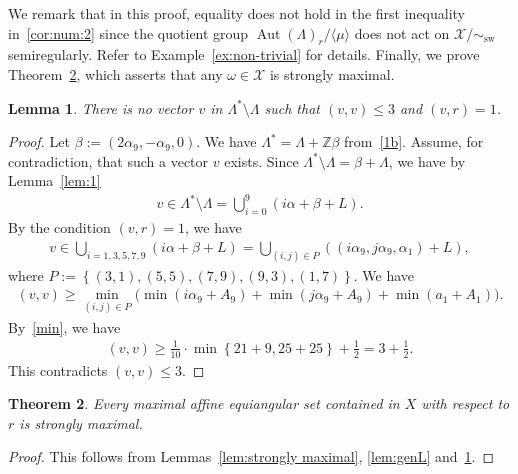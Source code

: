 \documentclass[reqno, 11pt]{amsart}
\numberwithin{equation}{section}
\newtheorem{lem}{Lemma}[section]
\newtheorem{thm}[lem]{Theorem}%
\theoremstyle{definition}
\DeclareMathOperator{\Aut}{Aut}
\DeclareMathOperator{\sw}{sw}
\newcommand{\aes}{\omega}
\newcommand{\cX}{\mathcal{X}}
\newcommand{\Z}{\mathbb{Z}}
\newcommand{\sr}{ r } %
\begin{document}
We remark that in this proof, equality does not hold in the first inequality in~\eqref{cor:num:2} since the quotient group $\Aut(\Lambda)_{\sr}/\langle \mu \rangle$ does not act on $\cX/\sim_{\sw}$ semiregularly.
Refer to Example~\ref{ex:non-trivial} for details. 
Finally, we prove Theorem~\ref{thm:strongly maximal}, which asserts that any $\aes \in \cX$ is strongly maximal.
\begin{lem}	\label{lem:11}
	There is no vector $v$ in $\Lambda^* \setminus \Lambda$ such that $(v,v) \leq 3$ and $(v,\sr) = 1$.
\end{lem}
\begin{proof}
	Let $\beta := (2\alpha_9, -\alpha_9, 0)$.
	We have $\Lambda^* = \Lambda +  \Z \beta$ from~\eqref{1b}.
	Assume, for contradiction, that such a vector $v$ exists.
	Since $\Lambda^* \setminus \Lambda = \beta + \Lambda$, we have by Lemma~\ref{lem:1}
	\begin{align*}
		v \in \Lambda^* \setminus \Lambda
		= \bigcup_{i=0}^{9} ( i \alpha + \beta  + L ).
	\end{align*}
	By the condition $(v,\sr)  = 1$, we have
	\begin{align*}
		v
		\in \bigcup_{i=1,3,5,7,9} ( i \alpha + \beta  + L )
		= \bigcup_{(i,j) \in P} \left((i \alpha_9, j \alpha_9 , \alpha_1) + L \right),
	\end{align*}
	where
	$
		P := \left\{ (3,1),(5,5),(7,9),(9,3),(1,7)  \right\}.
	$
	We have
	\begin{align*}
		(v,v) \geq \min_{(i,j) \in P} \big( \min\left(i \alpha_9 + A_9 \right)+ \min\left( j \alpha_9 + A_9 \right) + \min\left( a_1 + A_1 \right) \big).
	\end{align*}
	By~\eqref{min}, we have
	\begin{align*}
		(v,v) \geq \frac{1}{10} \cdot \min \left\{
		21+9,
		25+25
		\right\} + \frac{1}{2}
		= 3 + \frac{1}{2}.
	\end{align*}
	This contradicts $(v,v) \leq 3$.
\end{proof}



\begin{thm}	\label{thm:strongly maximal}
	Every maximal affine equiangular set contained in $X$
	with respect to $\sr$ is strongly maximal.
\end{thm}
\begin{proof}
	This follows from Lemmas~\ref{lem:strongly maximal}, \ref{lem:genL} and~\ref{lem:11}.
\end{proof}
\end{document}
